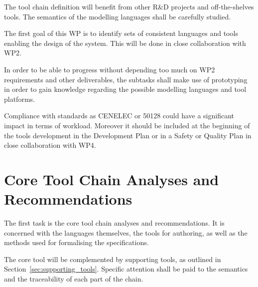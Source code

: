\documentclass{template/openetcs_article}
\begin{document}
The tool chain definition will benefit from other R\&D projects and off-the-shelves tools. The semantics of the modelling languages shall be carefully studied.

The first goal of this WP is to identify sets of consistent languages and tools enabling the design of the system.  This will be done in close collaboration with WP2.

In order to be able to progress without depending too much on WP2 requirements and other deliverables, the subtasks shall make use of prototyping in order to gain knowledge regarding the possible modelling languages and tool platforms.  

Compliance with standards as CENELEC or 50128 could have a
significant impact in terms of workload. Moreover it should be included at the
beginning of the tools development in the Development Plan or in a Safety or
Quality Plan in close collaboration with WP4.

\section{Core Tool Chain Analyses and Recommendations}
\label{sec:core_tool}
The first task is the core tool chain analyses and recommendations. It
is concerned with the languages themselves, the tools for authoring, as well as the methods used for formalising the specifications.

The core tool will be complemented by supporting tools, as outlined in Section~\ref{sec:supporting_tools}.
Specific attention shall be paid to the semantics and the traceability of each part of the chain.




\end{document}
